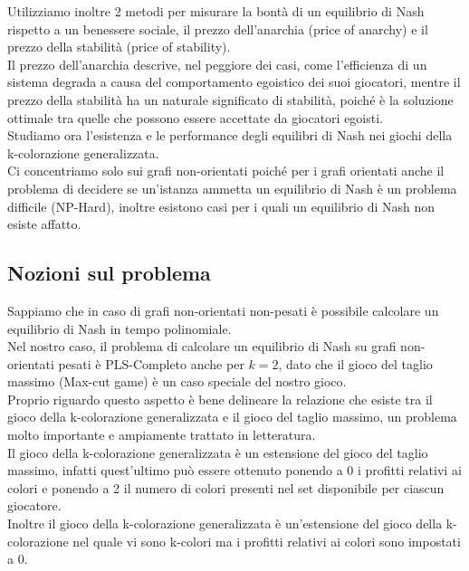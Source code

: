 Utilizziamo inoltre 2 metodi per misurare la bontà di un equilibrio di Nash rispetto a un benessere sociale, il prezzo dell'anarchia (price of anarchy) e il prezzo della stabilità (price of stability).\\
Il prezzo dell'anarchia descrive, nel peggiore dei casi, come l'efficienza di un sistema degrada a causa del comportamento egoistico dei suoi giocatori, mentre il prezzo della stabilità ha un naturale significato di stabilità, poiché è la soluzione ottimale tra quelle che possono essere accettate da giocatori egoisti.\\
Studiamo ora l'esistenza e le performance degli equilibri di Nash nei giochi della k-colorazione generalizzata.\\
Ci concentriamo solo sui grafi non-orientati poiché per i grafi orientati anche il problema di decidere se un'istanza ammetta un equilibrio di Nash è un problema difficile (NP-Hard), inoltre esistono casi per i quali un equilibrio di Nash non esiste affatto.\newline

\subsection{Nozioni sul problema}
\justify
Sappiamo che in caso di grafi non-orientati non-pesati è possibile calcolare un equilibrio di Nash in tempo polinomiale.\\
Nel nostro caso, il problema di calcolare un equilibrio di Nash su grafi non-orientati pesati è PLS-Completo anche per \(k = 2\), dato che il gioco del taglio massimo (Max-cut game) è un caso speciale del nostro gioco.\\
Proprio riguardo questo aspetto è bene delineare la relazione che esiste tra il gioco della k-colorazione generalizzata e il gioco del taglio massimo, un problema molto importante e ampiamente trattato in letteratura.\\
Il gioco della k-colorazione generalizzata è un estensione del gioco del taglio massimo, infatti quest'ultimo può essere ottenuto ponendo a 0 i profitti relativi ai colori e ponendo a 2 il numero di colori presenti nel set disponibile per ciascun giocatore.\\
Inoltre il gioco della k-colorazione generalizzata è un'estensione del gioco della k-colorazione nel quale vi sono k-colori ma i profitti relativi ai colori sono impostati a 0.\newline

